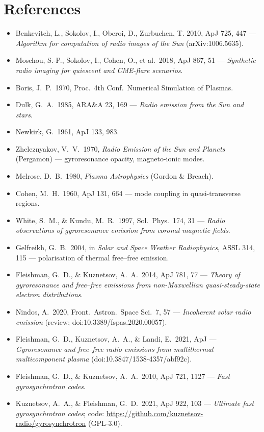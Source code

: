 \chapter{References}
\begin{itemize}[itemsep=2pt]
\item Benkevitch, L., Sokolov, I., Oberoi, D., Zurbuchen, T. 2010, ApJ 725, 447 --- \emph{Algorithm for computation of radio images of the Sun} (arXiv:1006.5635).
\item Moschou, S.-P., Sokolov, I., Cohen, O., et al.\ 2018, ApJ 867, 51 --- \emph{Synthetic radio imaging for quiescent and CME-flare scenarios}.
\item Boris, J.\ P.\ 1970, Proc.\ 4th Conf.\ Numerical Simulation of Plasmas.
\item Dulk, G.\ A.\ 1985, ARA\&A 23, 169 --- \emph{Radio emission from the Sun and stars}.
\item Newkirk, G.\ 1961, ApJ 133, 983.
\item Zheleznyakov, V.\ V.\ 1970, \emph{Radio Emission of the Sun and Planets} (Pergamon) --- gyroresonance opacity, magneto-ionic modes.
\item Melrose, D.\ B.\ 1980, \emph{Plasma Astrophysics} (Gordon \& Breach).
\item Cohen, M.\ H.\ 1960, ApJ 131, 664 --- mode coupling in quasi-transverse regions.
\item White, S.\ M., \& Kundu, M.\ R.\ 1997, Sol.\ Phys.\ 174, 31 --- \emph{Radio observations of gyroresonance emission from coronal magnetic fields}.
\item Gelfreikh, G.\ B.\ 2004, in \emph{Solar and Space Weather Radiophysics}, ASSL 314, 115 --- polarisation of thermal free--free emission.
\item Fleishman, G.\ D., \& Kuznetsov, A.\ A.\ 2014, ApJ 781, 77 --- \emph{Theory of gyroresonance and free--free emissions from non-Maxwellian quasi-steady-state electron distributions}.
\item Nindos, A.\ 2020, Front.\ Astron.\ Space Sci.\ 7, 57 --- \emph{Incoherent solar radio emission} (review; doi:10.3389/fspas.2020.00057).
\item Fleishman, G.\ D., Kuznetsov, A.\ A., \& Landi, E.\ 2021, ApJ --- \emph{Gyroresonance and free--free radio emissions from multithermal multicomponent plasma} (doi:10.3847/1538-4357/abf92c).
\item Fleishman, G.\ D., \& Kuznetsov, A.\ A.\ 2010, ApJ 721, 1127 --- \emph{Fast gyrosynchrotron codes}.
\item Kuznetsov, A.\ A., \& Fleishman, G.\ D.\ 2021, ApJ 922, 103 --- \emph{Ultimate fast gyrosynchrotron codes}; code: \url{https://github.com/kuznetsov-radio/gyrosynchrotron} (GPL-3.0).

\end{itemize}
